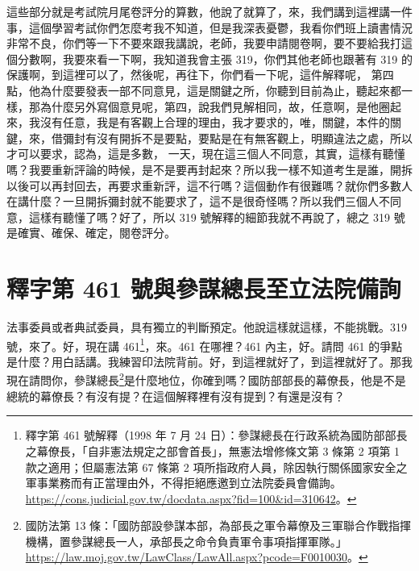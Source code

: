 \hypertarget{c08:cue:183}{}這些部分就是考試院月尾卷評分的算數，他說了就算了，來，我們講到這裡講一件事，這個學習考試你們怎麼考我不知道，但是我深表憂鬱，我看你們班上讀書情況非常不良，你們等一下不要來跟我講說，老師，我要申請閱卷啊，要不要給我打這個分數啊，我要來看一下啊，我知道我會主張 319，你們其他老師也跟著有 319 的保護啊，到這裡可以了，然後呢，再往下，你們看一下呢，這件解釋呢，
\hypertarget{c08:cue:184}{}第四點，他為什麼要發表一部不同意見，這是關鍵之所，你聽到目前為止，聽起來都一樣，那為什麼另外寫個意見呢，第四，說我們見解相同，故，任意啊，是他圈起來，我沒有任意，我是有客觀上合理的理由，我才要求的，唯，關鍵，本件的關鍵，來，借彌封有沒有開拆不是要點，要點是在有無客觀上，明顯違法之處，所以才可以要求，認為，這是多數，
\hypertarget{c08:cue:185}{}一天，現在這三個人不同意，其實，這樣有聽懂嗎？我要重新評論的時候，是不是要再封起來？所以我一樣不知道考生是誰，開拆以後可以再封回去，再要求重新評，這不行嗎？這個動作有很難嗎？就你們多數人在講什麼？一旦開拆彌封就不能要求了，這不是很奇怪嗎？所以我們三個人不同意，這樣有聽懂了嗎？好了，所以 319 號解釋的細節我就不再說了，總之 319 號是確實、確保、確定，閱卷評分。

\section{釋字第 461 號與參謀總長至立法院備詢}

\hypertarget{c08:cue:186}{}法事委員或者典試委員，具有獨立的判斷預定。他說這樣就這樣，不能挑戰。319 號，來了。好，現在講 461\footnote{釋字第 461 號解釋（1998 年 7 月 24 日）：參謀總長在行政系統為國防部部長之幕僚長，「自非憲法規定之部會首長」，無憲法增修條文第 3 條第 2 項第 1 款之適用；但屬憲法第 67 條第 2 項所指政府人員，除因執行關係國家安全之軍事業務而有正當理由外，不得拒絕應邀到立法院委員會備詢。\url{https://cons.judicial.gov.tw/docdata.aspx?fid=100&id=310642}。}，來。461 在哪裡？461 內主，好。請問 461 的爭點是什麼？用白話講。我練習印法院背前。好，到這裡就好了，到這裡就好了。那我現在請問你，參謀總長\footnote{國防法第 13 條：「國防部設參謀本部，為部長之軍令幕僚及三軍聯合作戰指揮機構，置參謀總長一人，承部長之命令負責軍令事項指揮軍隊。」\url{https://law.moj.gov.tw/LawClass/LawAll.aspx?pcode=F0010030}。}是什麼地位，你確到嗎？國防部部長的幕僚長，他是不是總統的幕僚長？有沒有提？在這個解釋裡有沒有提到？有還是沒有？

